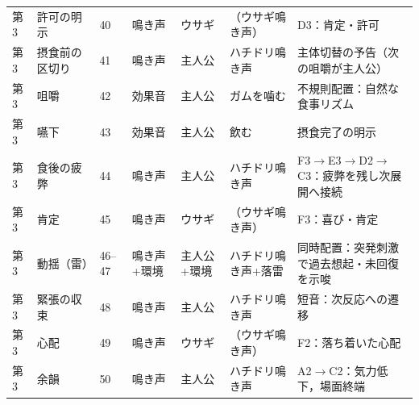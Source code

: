 \begin{longtable}{p{0.6cm} p{2.8cm} p{1.6cm} p{1.5cm} p{1.5cm} p{3.0cm} p{4.1cm}}
	第3          & 許可の明示                & 40                      & 鳴き声         & ウサギ           & （ウサギ鳴き声）                                  & D3：肯定・許可                                     \\
	第3          & 摂食前の区切り              & 41                      & 鳴き声         & 主人公           & ハチドリ鳴き声                                   & 主体切替の予告（次の咀嚼が主人公）                            \\
	第3          & 咀嚼                   & 42                      & 効果音         & 主人公           & ガムを噛む                                     & 不規則配置：自然な食事リズム                               \\
	第3          & 嚥下                   & 43                      & 効果音         & 主人公           & 飲む                                        & 摂食完了の明示                                      \\
	第3          & 食後の疲弊                & 44                      & 鳴き声         & 主人公           & ハチドリ鳴き声                                   & F3$\to$E3$\to$D2$\to$C3：疲弊を残し次展開へ接続          \\
	第3          & 肯定                   & 45                      & 鳴き声         & ウサギ           & （ウサギ鳴き声）                                  & F3：喜び・肯定                                     \\
	第3          & 動揺（雷）                & 46--47                  & 鳴き声+環境      & 主人公+環境        & ハチドリ鳴き声+落雷                                & 同時配置：突発刺激で過去想起・未回復を示唆                        \\
	第3          & 緊張の収束                & 48                      & 鳴き声         & 主人公           & ハチドリ鳴き声                                   & 短音：次反応への遷移                                   \\
	第3          & 心配                   & 49                      & 鳴き声         & ウサギ           & （ウサギ鳴き声）                                  & F2：落ち着いた心配                                   \\
	第3          & 余韻                   & 50                      & 鳴き声         & 主人公           & ハチドリ鳴き声                                   & A2$\to$C2：気力低下，場面終端                          \\


\end{longtable}
